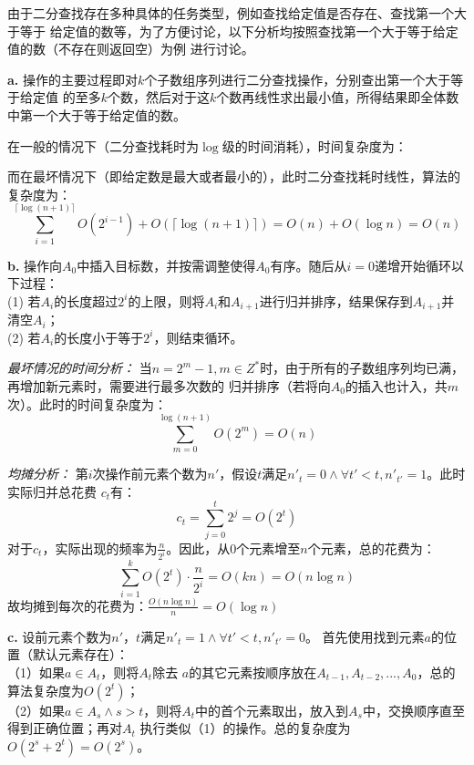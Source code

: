 \begin{solution}由于二分查找存在多种具体的任务类型，例如查找给定值是否存在、查找第一个大于等于
    给定值的数等，为了方便讨论，以下分析均按照查找第一个大于等于给定值的数（不存在则返回空）为例
    进行讨论。

\textbf{a.}
操作的主要过程即对$k$个子数组序列进行二分查找操作，分别查出第一个大于等于给定值
的至多$k$个数，然后对于这$k$个数再线性求出最小值，所得结果即全体数中第一个大于等于给定值的数。

在一般的情况下（二分查找耗时为$\log$级的时间消耗），时间复杂度为：

而在最坏情况下（即给定数是最大或者最小的），此时二分查找耗时线性，算法的复杂度为：
$$\sum_{i=1}^{\lceil\log (n+1)\rceil} O(2^{i-1}) + O(\lceil\log (n+1)\rceil) = O(n) + O(\log n) = O(n)$$

\textbf{b.}
操作向$A_0$中插入目标数，并按需调整使得$A_0$有序。随后从$i=0$递增开始循环以下过程：\\
(1) 若$A_i$的长度超过$2^i$的上限，则将$A_i$和$A_{i+1}$进行归并排序，结果保存到$A_{i+1}$并清空$A_{i}$；\\
(2) 若$A_i$的长度小于等于$2^i$，则结束循环。

\textit{最坏情况的时间分析：}
当$n=2^m-1, m \in Z^*$时，由于所有的子数组序列均已满，再增加新元素时，需要进行最多次数的
归并排序（若将向$A_0$的插入也计入，共$m$次）。此时的时间复杂度为：
$$\sum_{m=0}^{\log (n+1)} O(2^{m}) = O(n)$$

\textit{均摊分析：}
第$i$次操作前元素个数为$n'$，假设$t$满足$n'_t = 0 \wedge \forall t'<t, n'_{t'} = 1$。此时实际归并总花费
$c_t$有：
$$c_t = \sum_{j=0}^t 2^j = O(2^{t})$$
对于$c_t$，实际出现的频率为$\frac{n}{2^i}$。因此，从0个元素增至$n$个元素，总的花费为：
$$\sum_{i=1}^k O(2^{t}) \cdot \frac{n}{2^i} = O(kn) = O(n\log n)$$
故均摊到每次的花费为：$\frac{O(n\log n)}{n} = O(\log n)$


\textbf{c.}
设前元素个数为$n'$，$t$满足$n'_t = 1 \wedge \forall t'<t, n'_{t'} = 0$。
首先使用找到元素$a$的位置（默认元素存在）：\\
（1）如果$a \in A_t$，则将$A_t$除去
$a$的其它元素按顺序放在$A_{t-1},A_{t-2},...,A_0$，总的算法复杂度为$O(2^t)$；\\
（2）如果$a \in A_s \wedge s > t$，则将$A_t$中的首个元素取出，放入到$A_s$中，交换顺序直至得到正确位置；再对$A_t$
执行类似（1）的操作。总的复杂度为$O(2^s+2^t) = O(2^s)$。


\end{solution}
